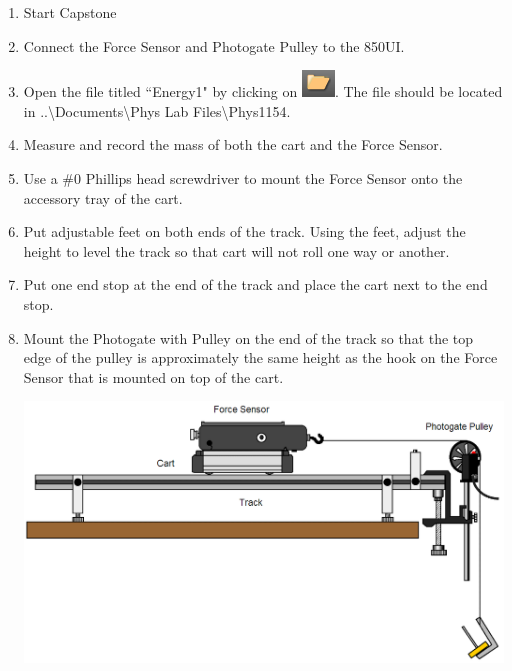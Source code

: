 \documentclass[main.tex]{subfiles}
\begin{document}
\begin{enumerate}
\item
Start Capstone
\item
Connect the Force Sensor and Photogate Pulley to the 850UI.
\item
Open the file titled ``Energy1" by clicking on \includegraphics{Open_Experiment}. The file should be located in ..\textbackslash Documents\textbackslash Phys Lab Files\textbackslash Phys1154.
\item
Measure and record the mass of both the cart and the Force Sensor.
\item
Use a \#0 Phillips head screwdriver to mount the Force Sensor onto the accessory tray of the cart.
\item
Put adjustable feet on both ends of the track. Using the feet, adjust the height to level the track so that cart will not roll one way or another.
\item
Put one end stop at the end of the track and place the cart next to the end stop.
\item
Mount the Photogate with Pulley on the end of the track so that the top edge of the pulley is approximately the same height as the hook on the Force Sensor that is mounted on top of the cart.

\includegraphics[width=\textwidth]{Energy_1_Setup}


\end{enumerate}
\end{document}
